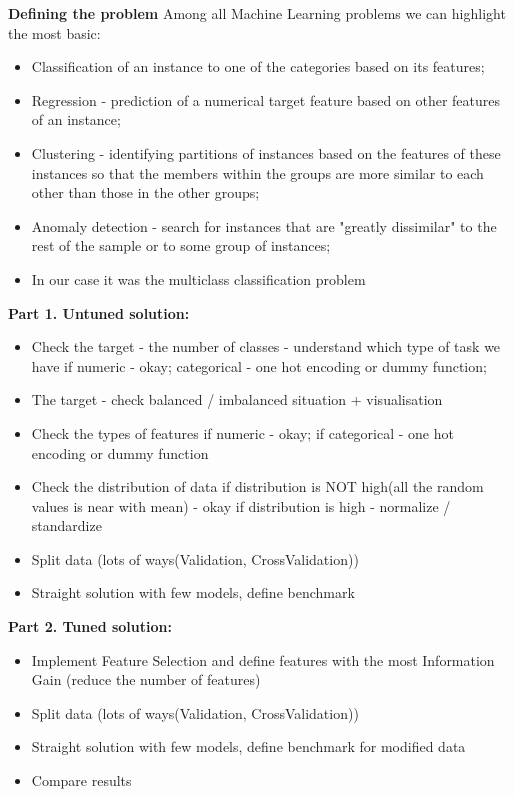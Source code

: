 \documentclass[12pt]{article}
\begin{document}
\textbf{Defining the problem}\newline
Among all Machine Learning problems we can highlight the most basic:
\begin{itemize}
  \item Classification of an instance to one of the categories based on its features;
  \item Regression - prediction of a numerical target feature based on other features of an instance;
  \item Clustering - identifying partitions of instances based on the features of these instances so that the members within the groups are more similar to each other than those in the other groups;
  \item Anomaly detection - search for instances that are "greatly dissimilar" to the rest of the sample or to some group of instances;
  \item In our case it was the multiclass classification problem
\end{itemize}\newline

\newpage
\textbf{Part 1. Untuned solution:}\newline
\begin{itemize}
    \item Check the target - the number of classes - understand which type of task we have
    \subitem if numeric - okay;
    \subitem categorical - one hot encoding or dummy function;
    \item The target - check balanced / imbalanced situation + visualisation
    \item Check the types of features
    \subitem if numeric - okay;
    \subitem if categorical - one hot encoding or dummy function
    \item Check the distribution of data
    \subitem if distribution is NOT high(all the random values is near with mean) - okay
    \subitem if distribution is high - normalize / standardize
    \item Split data (lots of ways(Validation, CrossValidation))
    \item Straight solution with few models, define benchmark
\end{itemize}
\textbf{Part 2. Tuned solution:}\newline
\begin{itemize}
\item Implement Feature Selection and define features with the most Information Gain (reduce the number of features)
\item  Split data (lots of ways(Validation, CrossValidation))
\item  Straight solution with few models, define benchmark for modified data
\item Compare results
\end{itemize}
\end{document}
